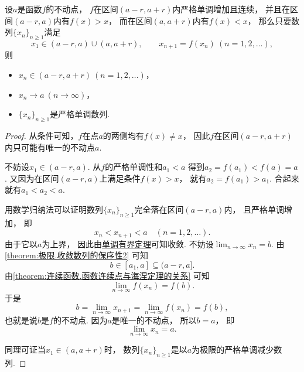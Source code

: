 \begin{proposition}\label{theorem:连续函数.单调迭代数列收敛定理}
设\(a\)是函数\(f\)的不动点，
\(f\)在区间\((a-r,a+r)\)内严格单调增加且连续，
并且在区间\((a-r,a)\)内有\(f(x)>x\)，
而在区间\((a,a+r)\)内有\(f(x)<x\)，
那么只要数列\(\{x_n\}_{n\geq1}\)满足\[
	x_1 \in (a-r,a)\cup(a,a+r),
	\qquad
	x_{n+1} = f(x_n)\ (n=1,2,\dotsc),
\]
则\begin{itemize}
	\item \(x_n \in (a-r,a+r)\ (n=1,2,\dotsc)\)，
	\item \(x_n \to a\ (n\to\infty)\)，
	\item \(\{x_n\}_{n\geq1}\)是严格单调数列.
\end{itemize}
\begin{proof}
从条件可知，\(f\)在点\(a\)的两侧均有\(f(x) \neq x\)，
因此\(f\)在区间\((a-r,a+r)\)内只可能有唯一的不动点\(a\).

不妨设\(x_1 \in (a-r,a)\).
从\(f\)的严格单调性和\(a_1 < a\)
得到\(a_2 = f(a_1) < f(a) = a\).
又因为在区间\((a-r,a)\)上满足条件\(f(x) > x\)，
就有\(a_2 = f(a_1) > a_1\).
合起来就有\(a_1 < a_2 < a\).

用数学归纳法可以证明数列\(\{x_n\}_{n\geq1}\)完全落在区间\((a-r,a)\)内，
且严格单调增加，
即\[
	x_n < x_{n+1} < a
	\quad(n=1,2,\dotsc).
\]
由于它以\(a\)为上界，
因此由\hyperref[theorem:极限.数列的单调有界定理]{单调有界定理}可知收敛.
不妨设\(\lim_{n\to\infty} x_n = b\).
由\cref{theorem:极限.收敛数列的保序性2} 可知\[
	b \in [a_1,a] \subseteq (a-r,a].
\]
由\cref{theorem:连续函数.函数连续点与海涅定理的关系} 可知\[
	\lim_{n\to\infty} f(x_n) = f(b).
\]
于是\[
	b = \lim_{n\to\infty} x_{n+1}
	= \lim_{n\to\infty} f(x_n)
	= f(b),
\]
也就是说\(b\)是\(f\)的不动点.
因为\(a\)是唯一的不动点，
所以\(b = a\)，
即\[
	\lim_{n\to\infty} x_n = a.
\]

同理可证当\(x_1 \in (a,a+r)\)时，
数列\(\{x_n\}_{n\geq1}\)是以\(a\)为极限的严格单调减少数列.
\end{proof}
\end{proposition}
